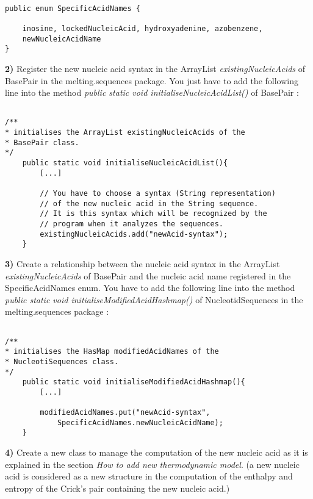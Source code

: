\documentclass{article}
\begin{document}
\begin{verbatim}

public enum SpecificAcidNames {

	inosine, lockedNucleicAcid, hydroxyadenine, azobenzene, 
	newNucleicAcidName
}

\end{verbatim}


\textbf{2)} Register the new nucleic acid syntax in the ArrayList \textit{existingNucleicAcids}
of BasePair in the melting.sequences package. You just have to add the following line
into the method \textit{public static void initialiseNucleicAcidList()} of BasePair :

\begin{verbatim}

/**
* initialises the ArrayList existingNucleicAcids of the 
* BasePair class.
*/
	public static void initialiseNucleicAcidList(){
		[...] 
		
		// You have to choose a syntax (String representation) 
		// of the new nucleic acid in the String sequence.
		// It is this syntax which will be recognized by the 
		// program when it analyzes the sequences.
		existingNucleicAcids.add("newAcid-syntax");
	}

\end{verbatim}


\textbf{3)} Create a relationship between the nucleic acid syntax in the ArrayList 
\textit{existingNucleicAcids} of BasePair and the
nucleic acid name registered in the SpecificAcidNames enum. You have to add
the following line into the method \textit{public static void initialiseModifiedAcidHashmap()}
of NucleotidSequences in the melting.sequences package :

\begin{verbatim}

/**
* initialises the HasMap modifiedAcidNames of the 
* NucleotiSequences class.
*/
	public static void initialiseModifiedAcidHashmap(){
		[...]
		
		modifiedAcidNames.put("newAcid-syntax", 
		    SpecificAcidNames.newNucleicAcidName);
	}

\end{verbatim}


\textbf{4)} Create a new class to manage the computation of the new nucleic acid as it is
explained in the section \textit{How to add new thermodynamic model}. (a new nucleic
acid is considered as a new structure in the computation of the enthalpy and entropy of
the Crick's pair containing the new nucleic acid.)
\end{document}
